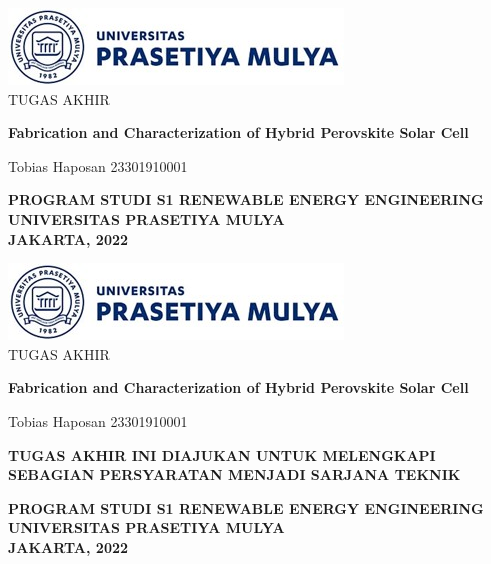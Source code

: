 \begin{center}
        \vspace*{0.5cm}
        \includegraphics{content-headers/img-admin/pmlogo.jpg}\\
        \vspace{1cm}
        {\Large TUGAS AKHIR}\\
        \vspace{1.2cm}
        {\huge \textbf{Fabrication and Characterization of Hybrid Perovskite Solar Cell}\par}
        \vspace{0.8cm}
        {\Large Tobias Haposan 23301910001\par}
        \vspace{9cm}
        {\textbf{PROGRAM STUDI S1 RENEWABLE ENERGY ENGINEERING}}\\
        \vspace{0.3cm}
        {\textbf{UNIVERSITAS PRASETIYA MULYA}}\\
        \vspace{0.3cm}
        {\textbf{JAKARTA, 2022}}\\
\end{center}

\newpage
\begin{center}
        \vspace*{0.5cm}
        \includegraphics{content-headers/img-admin/pmlogo.jpg}\\
        \vspace{1cm}
        {\Large TUGAS AKHIR}\\
        \vspace{1.2cm}
        {\huge \textbf{Fabrication and Characterization of Hybrid Perovskite Solar Cell}\par}
        \vspace{0.8cm}
        {\Large Tobias Haposan 23301910001\par}
        \vspace{1cm}
        {\textbf{TUGAS AKHIR INI DIAJUKAN UNTUK MELENGKAPI SEBAGIAN PERSYARATAN MENJADI SARJANA TEKNIK}} \par
        \vspace{7cm}
        {\textbf{PROGRAM STUDI S1 RENEWABLE ENERGY ENGINEERING}}\\
        \vspace{0.3cm}
        {\textbf{UNIVERSITAS PRASETIYA MULYA}}\\
        \vspace{0.3cm}
        {\textbf{JAKARTA, 2022}}\\
\end{center}